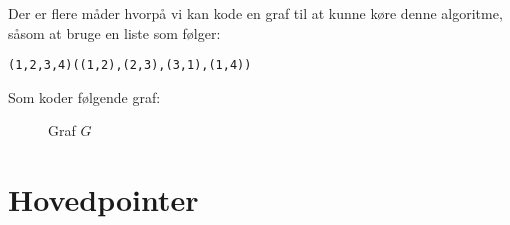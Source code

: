 Der er flere måder hvorpå vi kan kode en graf til at kunne køre denne algoritme, såsom at bruge en liste som følger:
\begin{verbatim}
(1,2,3,4)((1,2),(2,3),(3,1),(1,4))
\end{verbatim}
Som koder følgende graf:
\begin{figure}[ht]
  \centering
  \caption{\label{fig:label} Graf $G$}
\end{figure}

\section{Hovedpointer}%
\label{sec:tmhovedpointer}


